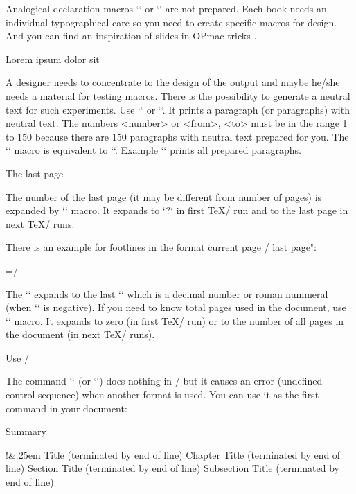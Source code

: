 {Analogical declaration macros `\book` or `\slides` are not prepared. Each
book needs an individual typographical care so you need to create specific
macros for design. And you can find an inspiration of slides in OPmac tricks
.

\secc Lorem ipsum dolor sit

\new
A designer needs to concentrate to the design of the output and maybe he/she 
needs a material for testing macros. There is the possibility to generate a
neutral text for such experiments. Use `\lorem[<number>]` or
`\lorem[<from>-<to>]`. It prints a paragraph (or paragraphs) with neutral
text. The numbers <number> or <from>, <to> must be in the range 1 to 150
because there are 150 paragraphs with neutral text prepared for you.
The `\lipsum` macro is equivalent to `\lorem`. Example `\lipsum[1-150]`
prints all prepared paragraphs.

\secc The last page

The number of the last page (it may be different from number of pages) is
expanded by `\lastpage` macro. It expands to `?` in first \TeX/ run and to
the last page in next \TeX/ runs. 

There is an example for footlines in the format \"current page / last page": 

\begtt
\footline={\hss \fixedrm \folio/\lastpage \hss}
\endtt

\new
The `\lastpage` expands to the last `\folio` which is a decimal
number or roman nummeral (when `\pageno` is negative). If you need to know
total pages used in the document, use `\totalpages` macro. It expands to 
zero (in first \TeX/ run) or to the number of all pages in the document
(in next \TeX/ runs). 

\secc Use \OpTeX/

\new
The command `\useOpTeX` (or `\useoptex`) does nothing in \OpTeX/ but it causes 
an error (undefined control sequence) when another format is used. You can use it as
the first command in your document:

\begtt
\useOpTeX %
\endtt


\sec Summary

\begtt     \typosize[10/12]\adef!{\string\endtt}\adef&{\kern.25em}
\tit Title (terminated by end of line)
\chap Chapter Title (terminated by end of line)
\sec Section Title (terminated by end of line)
\secc Subsection Title (terminated by end of line)

}
